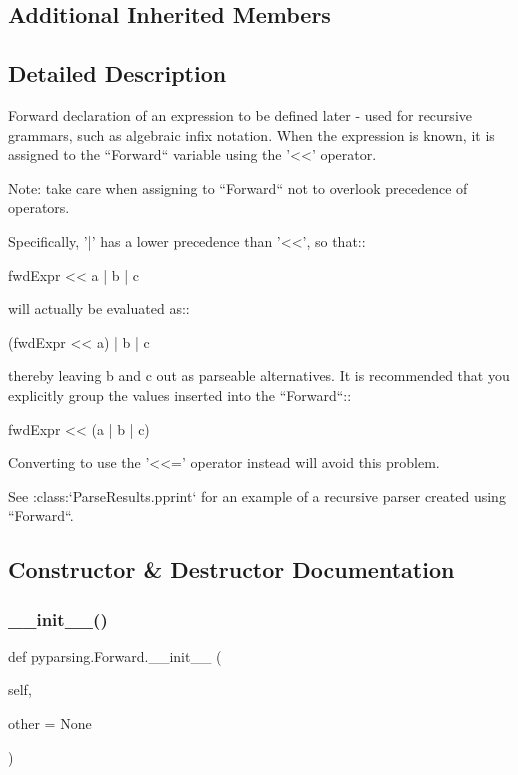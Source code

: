 \subsection*{Additional Inherited Members}


\subsection{Detailed Description}
\begin{DoxyVerb}Forward declaration of an expression to be defined later -
used for recursive grammars, such as algebraic infix notation.
When the expression is known, it is assigned to the ``Forward``
variable using the '<<' operator.

Note: take care when assigning to ``Forward`` not to overlook
precedence of operators.

Specifically, '|' has a lower precedence than '<<', so that::

    fwdExpr << a | b | c

will actually be evaluated as::

    (fwdExpr << a) | b | c

thereby leaving b and c out as parseable alternatives.  It is recommended that you
explicitly group the values inserted into the ``Forward``::

    fwdExpr << (a | b | c)

Converting to use the '<<=' operator instead will avoid this problem.

See :class:`ParseResults.pprint` for an example of a recursive
parser created using ``Forward``.
\end{DoxyVerb}
 

\subsection{Constructor \& Destructor Documentation}
\mbox{\label{classpyparsing_1_1Forward_ad62a5b965ee0e43d6f0f54e6421d99bb}} 
\subsubsection{\texorpdfstring{\+\_\+\+\_\+init\+\_\+\+\_\+()}{\_\_init\_\_()}}
{\footnotesize\ttfamily def pyparsing.\+Forward.\+\_\+\+\_\+init\+\_\+\+\_\+ (\begin{DoxyParamCaption}\item[{}]{self,  }\item[{}]{other = {\ttfamily None} }\end{DoxyParamCaption})}



